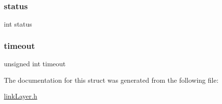\subsubsection{\texorpdfstring{status}{status}}
{\footnotesize\ttfamily int status}

\hypertarget{struct_link_layer_a25af7eefd48048fb067a60b8e295caf1}{}\label{struct_link_layer_a25af7eefd48048fb067a60b8e295caf1} 
\subsubsection{\texorpdfstring{timeout}{timeout}}
{\footnotesize\ttfamily unsigned int timeout}



The documentation for this struct was generated from the following file\+:\begin{DoxyCompactItemize}
\item 
\hyperlink{link_layer_8h}{link\+Layer.\+h}\end{DoxyCompactItemize}
